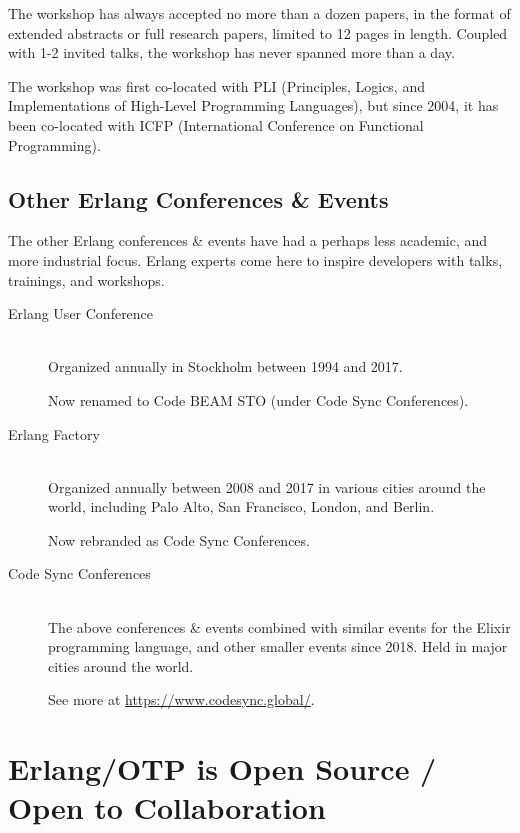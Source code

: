 The workshop has always accepted no more than a dozen papers, in the
format of extended abstracts or full research papers, limited to 12
pages in length.  Coupled with 1-2 invited talks, the workshop has
never spanned more than a day.

The workshop was first co-located with PLI (Principles, Logics, and
Implementations of High-Level Programming Languages), but since 2004,
it has been co-located with ICFP (International Conference on
Functional Programming).

\subsection{Other Erlang Conferences \& Events}

The other Erlang conferences \& events have had a perhaps less
academic, and more industrial focus. Erlang experts come here to
inspire developers with talks, trainings, and workshops.

\begin{description}

\item[Erlang User Conference]\ \\ Organized annually in Stockholm
between 1994 and 2017.

Now renamed to Code BEAM STO (under Code Sync Conferences).

\item[Erlang Factory]\ \\ Organized annually between 2008 and 2017 in
various cities around the world, including Palo Alto, San Francisco,
London, and Berlin.

Now rebranded as Code Sync Conferences.

\item[Code Sync Conferences]\ \\ The above conferences \& events
combined with similar events for the Elixir programming language, and
other smaller events since 2018. Held in major cities around the
world.

See more at \url{https://www.codesync.global/}.

\end{description}

\section{Erlang/OTP is Open Source / Open to Collaboration}
\label{app:erlang-otp-is-open-source}

